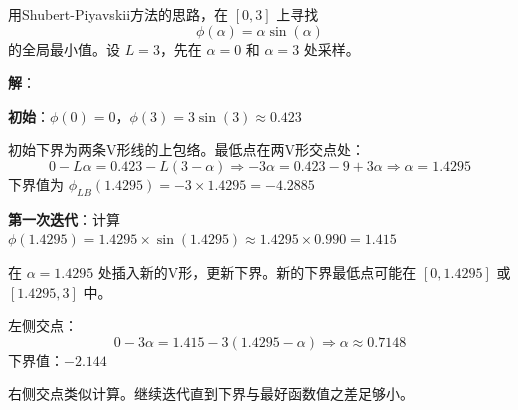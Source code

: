 \begin{example}
用Shubert-Piyavskii方法的思路，在 $[0, 3]$ 上寻找
\[
\phi(\alpha) = \alpha \sin(\alpha)
\]
的全局最小值。设 $L = 3$，先在 $\alpha = 0$ 和 $\alpha = 3$ 处采样。

\textbf{解}：

\textbf{初始}：$\phi(0) = 0$，$\phi(3) = 3\sin(3) \approx 0.423$

初始下界为两条V形线的上包络。最低点在两V形交点处：
\[
0 - L\alpha = 0.423 - L(3-\alpha) \Rightarrow -3\alpha = 0.423 - 9 + 3\alpha \Rightarrow \alpha = 1.4295
\]
下界值为 $\phi_{LB}(1.4295) = -3 \times 1.4295 = -4.2885$

\textbf{第一次迭代}：计算 $\phi(1.4295) = 1.4295 \times \sin(1.4295) \approx 1.4295 \times 0.990 = 1.415$

在 $\alpha = 1.4295$ 处插入新的V形，更新下界。新的下界最低点可能在 $[0, 1.4295]$ 或 $[1.4295, 3]$ 中。

左侧交点：
\[
0 - 3\alpha = 1.415 - 3(1.4295 - \alpha) \Rightarrow \alpha \approx 0.7148
\]
下界值：$-2.144$

右侧交点类似计算。继续迭代直到下界与最好函数值之差足够小。
\end{example}

